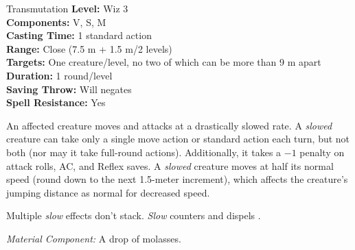 {Transmutation}
{
	\textbf{Level:}
	Wiz 3\\
	\textbf{Components:}
	V, S, M\\
	\textbf{Casting Time:}
	1 standard action\\
	\textbf{Range:}
	Close (7.5 m + 1.5 m/2 levels)\\
	\textbf{Targets:}
	One creature/level, no two of which can be more than 9 m apart\\
	\textbf{Duration:}
	1 round/level\\
	\textbf{Saving Throw:}
	Will negates\\
	\textbf{Spell Resistance:}
	Yes\\
}
{
	An affected creature moves and attacks at a drastically slowed rate. A \emph{slowed} creature can take only a single move action or standard action each turn, but not both (nor may it take full-round actions). Additionally, it takes a $-1$ penalty on attack rolls, AC, and Reflex saves. A \emph{slowed} creature moves at half its normal speed (round down to the next 1.5-meter increment), which affects the creature's jumping distance as normal for decreased speed.

	Multiple \emph{slow} effects don't stack. \emph{Slow} counters and dispels .

	\textit{Material Component:}
	A drop of molasses.

}
